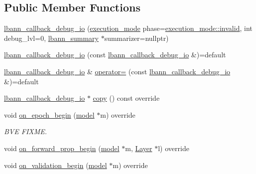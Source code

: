 \subsection*{Public Member Functions}
\begin{DoxyCompactItemize}
\item 
\hyperlink{classlbann_1_1lbann__callback__debug__io_a4103f7a133e2e7a8afe8744fc9345e2c}{lbann\+\_\+callback\+\_\+debug\+\_\+io} (\hyperlink{base_8hpp_a2781a159088df64ed7d47cc91c4dc0a8}{execution\+\_\+mode} phase=\hyperlink{base_8hpp_a2781a159088df64ed7d47cc91c4dc0a8afedb2d84cafe20862cb4399751a8a7e3}{execution\+\_\+mode\+::invalid}, int debug\+\_\+lvl=0, \hyperlink{classlbann_1_1lbann__summary}{lbann\+\_\+summary} $\ast$summarizer=nullptr)
\item 
\hyperlink{classlbann_1_1lbann__callback__debug__io_ae3b6fceef4e765ce66527b2a44ae8f3a}{lbann\+\_\+callback\+\_\+debug\+\_\+io} (const \hyperlink{classlbann_1_1lbann__callback__debug__io}{lbann\+\_\+callback\+\_\+debug\+\_\+io} \&)=default
\item 
\hyperlink{classlbann_1_1lbann__callback__debug__io}{lbann\+\_\+callback\+\_\+debug\+\_\+io} \& \hyperlink{classlbann_1_1lbann__callback__debug__io_ae424948cc2809272c1cd755b8e2f0c3d}{operator=} (const \hyperlink{classlbann_1_1lbann__callback__debug__io}{lbann\+\_\+callback\+\_\+debug\+\_\+io} \&)=default
\item 
\hyperlink{classlbann_1_1lbann__callback__debug__io}{lbann\+\_\+callback\+\_\+debug\+\_\+io} $\ast$ \hyperlink{classlbann_1_1lbann__callback__debug__io_a91fb292d9dff96dbf72ecc16855c4092}{copy} () const override
\item 
void \hyperlink{classlbann_1_1lbann__callback__debug__io_aa3d2a6fb4d7375c05ece0058224ea792}{on\+\_\+epoch\+\_\+begin} (\hyperlink{classlbann_1_1model}{model} $\ast$m) override
\begin{DoxyCompactList}\small\item\em B\+VE F\+I\+X\+ME. \end{DoxyCompactList}\item 
void \hyperlink{classlbann_1_1lbann__callback__debug__io_aa31ee265d40edff982ebf38054394927}{on\+\_\+forward\+\_\+prop\+\_\+begin} (\hyperlink{classlbann_1_1model}{model} $\ast$m, \hyperlink{classlbann_1_1Layer}{Layer} $\ast$l) override
\item 
void \hyperlink{classlbann_1_1lbann__callback__debug__io_ac26d9c113c1345cc1d6390141e1a894b}{on\+\_\+validation\+\_\+begin} (\hyperlink{classlbann_1_1model}{model} $\ast$m) override
\item 

\end{DoxyCompactItemize}
